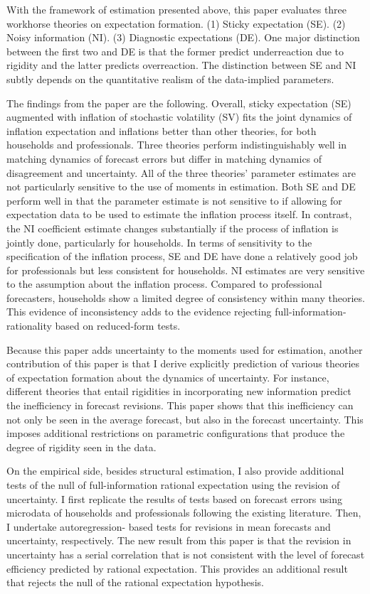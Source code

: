 \documentclass[12pt]{article}
\begin{document}
	With the framework of estimation presented above, this paper evaluates three workhorse theories on expectation formation. (1) Sticky expectation (SE). (2) Noisy information (NI). (3) Diagnostic expectations (DE).  One major distinction between the first two and DE is that the former predict underreaction due to rigidity and the latter predicts overreaction.  The distinction between SE and NI subtly depends on the quantitative realism of the data-implied parameters. 
	
	The findings from the paper are the following.
	Overall, sticky expectation (SE) augmented with inflation of stochastic volatility (SV) fits the joint dynamics of inflation expectation and inflations better than other theories, for both households and professionals. 
	Three theories perform indistinguishably well in matching dynamics of forecast errors but differ in matching dynamics of disagreement and uncertainty. 
	All of the three theories' parameter estimates are not particularly sensitive to the use of moments in estimation. 
	Both SE and DE perform well in that the parameter estimate is not sensitive to if allowing for expectation data to be used to estimate the inflation process itself. In contrast, the NI coefficient estimate changes substantially if the process of inflation is jointly done, particularly for households. 
	In terms of sensitivity to the specification of the inflation process, SE and DE have done a relatively good job for professionals but less consistent for households. NI estimates are very sensitive to the assumption about the inflation process.
	Compared to professional forecasters, households show a limited degree of consistency within many theories. This evidence of inconsistency adds to the evidence rejecting full-information-rationality based on reduced-form tests. 
	
	
	Because this paper adds uncertainty to the moments used for estimation, another contribution of this paper is that I derive explicitly prediction of various theories of expectation formation about the dynamics of uncertainty. For instance, different theories that entail rigidities in incorporating new information predict the inefficiency in forecast revisions. This paper shows that this inefficiency can not only be seen in the average forecast, but also in the forecast uncertainty. This imposes additional restrictions on parametric configurations that produce the degree of rigidity seen in the data. 
	
	On the empirical side, besides structural estimation, I also provide additional tests of the null of full-information rational expectation using the revision of uncertainty. I first replicate the results of tests based on forecast errors using microdata of households and professionals following the existing literature. Then, I undertake autoregression- based tests for revisions in mean forecasts and uncertainty, respectively. The new result from this paper is that the revision in uncertainty has a serial correlation that is not consistent with the level of forecast efficiency predicted by rational expectation. This provides an additional result that rejects the null of the rational expectation hypothesis. 
	
\end{document}

